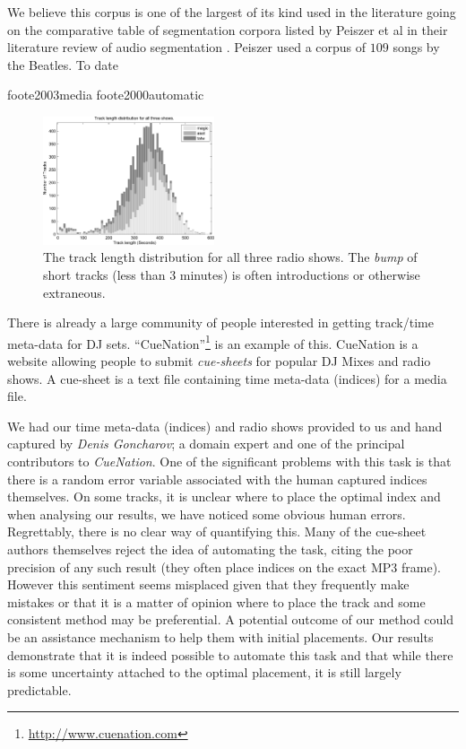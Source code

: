 \documentclass[twocolumn]{article}
\begin{document}
	We believe this corpus is one of the largest of its kind used in the literature going on the comparative table of segmentation corpora listed by Peiszer et al in their literature review of audio segmentation \cite{peiszer2008automatic}. Peiszer used a corpus of $109$ songs by the Beatles. To date
	
	foote2003media foote2000automatic 

	\begin{figure}
		\centering
		\includegraphics[width=0.45\textwidth]{images/tracklength}
		
		\caption{The track length distribution for all three radio shows. The \textit{bump} of short tracks (less than $3$ minutes) is often introductions or otherwise extraneous.}
		\label{fig:tracklengths}
	\end{figure} 
	
	There is already a large community of people interested in getting track/time meta-data for DJ sets. ``CueNation''\footnote{\url{http://www.cuenation.com}} is an example of this. CueNation is a website allowing people to submit \textit{cue-sheets} for popular DJ Mixes and radio shows. A cue-sheet is a text file containing time meta-data (indices) for a media file.
	
	We had our time meta-data (indices) and radio shows provided to us and hand captured by \textit{Denis Goncharov}; a domain expert and one of the principal contributors to \textit{CueNation}. One of the significant problems with this task is that there is a random error variable associated with the human captured indices themselves. On some tracks, it is unclear where to place the optimal index and when analysing our results, we have noticed some obvious human errors. Regrettably, there is no clear way of quantifying this. Many of the cue-sheet authors themselves reject the idea of automating the task, citing the poor precision of any such result (they often place indices on the exact MP3 frame). However this sentiment seems misplaced given that they frequently make mistakes or that it is a matter of opinion where to place the track and some consistent method may be preferential. A potential outcome of our method could be an assistance mechanism to help them with initial placements. Our results demonstrate that it is indeed possible to automate this task and that while there is some uncertainty attached to the optimal placement, it is still largely predictable.
	
\end{document}

